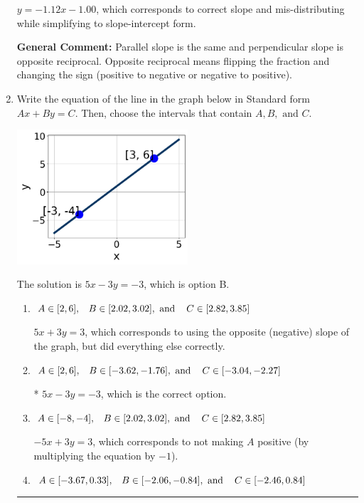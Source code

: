 \documentclass{extbook}[14pt]
\newcommand{\litem}[1]{\item #1

\rule{\textwidth}{0.4pt}}
\begin{document}
\begin{enumerate}
{\begin{enumerate}[label=\Alph*.]
 $y = -1.12x - 1.00$, which corresponds to correct slope and mis-distributing while simplifying to slope-intercept form.
\end{enumerate}

\textbf{General Comment:} Parallel slope is the same and perpendicular slope is opposite reciprocal. Opposite reciprocal means flipping the fraction and changing the sign (positive to negative or negative to positive).
}
\litem{
Write the equation of the line in the graph below in Standard form $Ax+By=C$. Then, choose the intervals that contain $A, B, \text{ and } C$.

\begin{center}
    \includegraphics[width=0.5\textwidth]{../Figures/linearGraphToStandardCopyC.png}
\end{center}


The solution is \( 5x - 3y = -3 \), which is option B.\begin{enumerate}[label=\Alph*.]
\item \( A \in [2, 6], \hspace{3mm} B \in [2.02, 3.02], \text{ and } \hspace{3mm} C \in [2.82, 3.85] \)

 $5x + 3y = 3$, which corresponds to using the opposite (negative) slope of the graph, but did everything else correctly.
\item \( A \in [2, 6], \hspace{3mm} B \in [-3.62, -1.76], \text{ and } \hspace{3mm} C \in [-3.04, -2.27] \)

* $5x - 3y = -3$, which is the correct option.
\item \( A \in [-8, -4], \hspace{3mm} B \in [2.02, 3.02], \text{ and } \hspace{3mm} C \in [2.82, 3.85] \)

 $-5x + 3y = 3$, which corresponds to not making $A$ positive (by multiplying the equation by $-1$).
\item \( A \in [-3.67, 0.33], \hspace{3mm} B \in [-2.06, -0.84], \text{ and } \hspace{3mm} C \in [-2.46, 0.84] \)


\end{enumerate}}
\end{enumerate}
\end{document}
